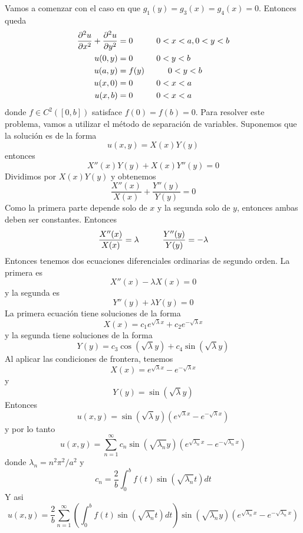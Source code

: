 \documentclass[11pt]{book}
\theoremstyle{plain}
\theoremstyle{definition}
\begin{document}
    Vamos a comenzar con el caso en que $g_{1}(y) = g_{3}(x) = g_{4}(x) = 0$. Entonces queda
    \begin{align*}
        \frac{\partial^{2}u}{\partial x^{2}} + \frac{\partial^{2}u}{\partial y^{2}} &= 0 \hspace{10mm} 0<x<a, 0<y<b\\
        u(0,y) &= 0 \hspace{10mm} 0<y<b\\
        u(a,y) &= f(y) \hspace{10mm} 0<y<b\\
        u(x,0) &= 0 \hspace{10mm} 0<x<a\\
        u(x,b) &= 0 \hspace{10mm} 0<x<a
    \end{align*}
    donde $f\in C^{2}([0,b])$ satisface $f(0) = f(b) = 0$. Para resolver este problema, vamos a utilizar el método de separación de variables. Suponemos que la solución es de la forma
    \[
        u(x,y) = X(x)Y(y)
    \]
    entonces
    \[
        X''(x)Y(y) + X(x)Y''(y) = 0
    \]
    Dividimos por $X(x)Y(y)$ y obtenemos
    \[
        \frac{X''(x)}{X(x)} + \frac{Y''(y)}{Y(y)} = 0
    \]
    Como la primera parte depende solo de $x$ y la segunda solo de $y$, entonces ambas deben ser constantes. Entonces
    \[
        \frac{X''(x)}{X(x)} = \lambda \hspace{10mm} \frac{Y''(y)}{Y(y)} = -\lambda
    \]
    Entonces tenemos dos ecuaciones diferenciales ordinarias de segundo orden. La primera es
    \[
        X''(x) - \lambda X(x) = 0
    \]
    y la segunda es
    \[
        Y''(y) + \lambda Y(y) = 0
    \]
    La primera ecuación tiene soluciones de la forma
    \[
        X(x) = c_{1}e^{\sqrt{\lambda}x} + c_{2}e^{-\sqrt{\lambda}x}
    \]
    y la segunda tiene soluciones de la forma
    \[
        Y(y) = c_{3}\cos(\sqrt{\lambda}y) + c_{4}\sin(\sqrt{\lambda}y)
    \]
    Al aplicar las condiciones de frontera, tenemos
    \[
        X(x) = e^{\sqrt{\lambda}x} - e^{-\sqrt{\lambda}x}
    \]
    y
    \[
        Y(y) = \sin(\sqrt{\lambda}y)
    \]
    Entonces
    \[
        u(x,y) = \sin(\sqrt{\lambda}y)(e^{\sqrt{\lambda}x} - e^{-\sqrt{\lambda}x})
    \]
    y por lo tanto
    \[
        u(x,y) = \sum_{n=1}^{\infty} c_{n}\sin(\sqrt{\lambda_{n}}y)(e^{\sqrt{\lambda_{n}}x} - e^{-\sqrt{\lambda_{n}}x})
    \]
    donde $\lambda_{n} = n^{2}\pi^{2}/a^{2}$ y
    \[
        c_{n} = \frac{2}{b}\int_{0}^{b} f(t)\sin(\sqrt{\lambda_{n}}t)dt
    \]
    Y asi
    \[
        u(x,y) = \frac{2}{b}\sum_{n=1}^{\infty} \left(\int_{0}^{b} f(t)\sin(\sqrt{\lambda_{n}}t)dt\right)\sin(\sqrt{\lambda_{n}}y)(e^{\sqrt{\lambda_{n}}x} - e^{-\sqrt{\lambda_{n}}x})
    \]
\end{document}
